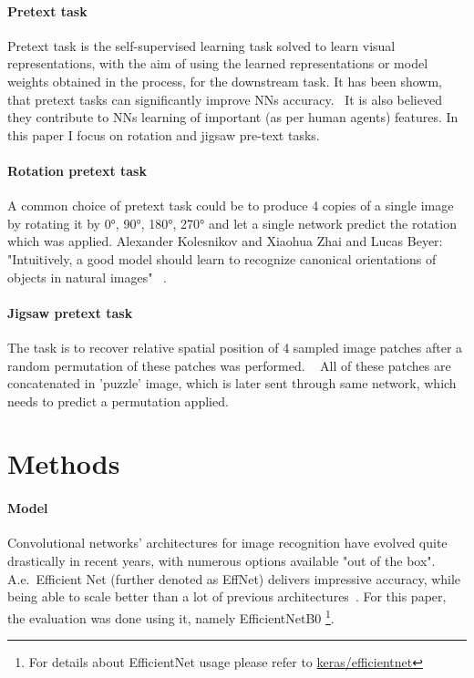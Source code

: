 \paragraph{Pretext task}
Pretext task is the self-supervised learning task solved to learn visual representations,
with the aim of using the learned representations or model weights obtained in the process, for the downstream task.
It has been showm, that pretext tasks can significantly improve NNs accuracy.~\cite{kolesnikov2019revisiting}
It is also believed they contribute to NNs learning of important (as per human agents) features.
In this paper I focus on rotation and jigsaw pre-text tasks.

\paragraph{Rotation pretext task}
A common choice of pretext task could be to produce 4 copies of
a single image by rotating it by {0°, 90°, 180°, 270°} and let a single network predict the rotation which was applied.
Alexander Kolesnikov and Xiaohua Zhai and Lucas Beyer: "Intuitively, a good model should learn to
recognize canonical orientations of objects in natural images" ~\cite{kolesnikov2019revisiting}.

\paragraph{Jigsaw pretext task}
The task is
to recover relative spatial position of 4 sampled image patches
after a random permutation of these patches was performed.
~\cite{kolesnikov2019revisiting}
All of these patches are concatenated in 'puzzle' image,
which is later sent through same network, which needs to predict a permutation applied.



\section{Methods}

\paragraph{Model}
Convolutional networks' architectures for image recognition have evolved quite drastically in recent years,
with numerous options available "out of the box".
A.e.\ Efficient Net (further denoted as EffNet) delivers impressive accuracy,
while being able to scale better than a lot of previous architectures~\cite{DBLP:journals/corr/abs-1905-11946}.
For this paper, the evaluation was done using it, namely EfficientNetB0
\footnote{For details about EfficientNet usage please refer to \href{https://keras.io/api/applications/efficientnet/}{keras/efficientnet}}.

